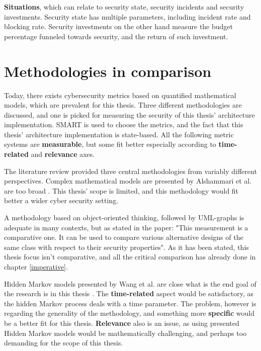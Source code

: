 \textbf{Situations}, which can relate to security state, security
incidents and security investments. Security state has multiple
parameters, including incident rate and blocking rate. Security
investments on the other hand measure the budget percentage funneled
towards security, and the return of such
investment. \cite{pendleton2016survey}

\section{Methodologies in comparison} \label{whyqueries}

Today, there exists cybersecurity metrics based on quantified
mathematical models, which are prevalent for this thesis. Three
different methodologies are discussed, and one is picked for measuring
the security of this thesis' architecture implementation. SMART is
used to choose the metrics, and the fact that this thesis'
architecture implementation is state-based. All the following metric
systems are \textbf{measurable}, but some fit better especially
according to \textbf{time-related} and \textbf{relevance} axes.

The literature review provided three central methodologies from
variably different perspectives. Complex mathematical models are
presented by Alshammari et al. are too broad
\cite{alshammari2009security}. This thesis' scope is limited, and this
methodology would fit better a wider cyber security setting.

A methodology based on object-oriented thinking, followed by
UML-graphs is adequate in many contexts, but as stated in the paper:
"This measurement is a comparative one. It can be used to compare
various alternative designs of the same class with respect to their
security properties". As it has been stated, this thesis focus isn't
comparative, and all the critical comparison has already done in
chapter \ref{imperative}.

Hidden Markov models presented by Wang et al. are close what is the
end goal of the research is in this thesis
\cite{wang2010framework}. The \textbf{time-related} aspect would be
satisfactory, as the hidden Markov process deals with a time
parameter. The problem, however is regarding the generality of the
methodology, and something more \textbf{specific} would be a better
fit for this thesis. \textbf{Relevance} also is an issue, as using
presented Hidden Markov models would be mathematically challenging,
and perhaps too demanding for the scope of this thesis.

